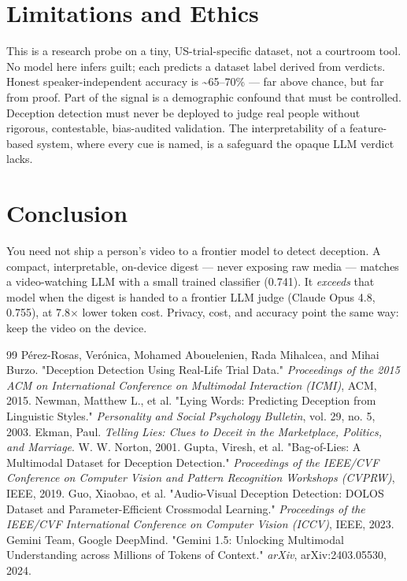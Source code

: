 \documentclass[11pt]{article}
\begin{document}
\section{Limitations and Ethics}

This is a research probe on a tiny, US-trial-specific dataset, not a courtroom tool. No model here infers guilt; each predicts a dataset label derived from verdicts. Honest speaker-independent accuracy is \textasciitilde{}65--70\% --- far above chance, but far from proof. Part of the signal is a demographic confound that must be controlled. Deception detection must never be deployed to judge real people without rigorous, contestable, bias-audited validation. The interpretability of a feature-based system, where every cue is named, is a safeguard the opaque LLM verdict lacks.

\section{Conclusion}

You need not ship a person's video to a frontier model to detect deception. A compact, interpretable, on-device digest --- never exposing raw media --- matches a video-watching LLM with a small trained classifier (0.741). It \emph{exceeds} that model when the digest is handed to a frontier LLM judge (Claude Opus 4.8, 0.755), at 7.8$\times$ lower token cost. Privacy, cost, and accuracy point the same way: keep the video on the device.

\begin{thebibliography}{99}
 Pérez-Rosas, Verónica, Mohamed Abouelenien, Rada Mihalcea, and Mihai Burzo. "Deception Detection Using Real-Life Trial Data." \emph{Proceedings of the 2015 ACM on International Conference on Multimodal Interaction (ICMI)}, ACM, 2015.
 Newman, Matthew L., et al. "Lying Words: Predicting Deception from Linguistic Styles." \emph{Personality and Social Psychology Bulletin}, vol. 29, no. 5, 2003.
 Ekman, Paul. \emph{Telling Lies: Clues to Deceit in the Marketplace, Politics, and Marriage}. W. W. Norton, 2001.
 Gupta, Viresh, et al. "Bag-of-Lies: A Multimodal Dataset for Deception Detection." \emph{Proceedings of the IEEE/CVF Conference on Computer Vision and Pattern Recognition Workshops (CVPRW)}, IEEE, 2019.
 Guo, Xiaobao, et al. "Audio-Visual Deception Detection: DOLOS Dataset and Parameter-Efficient Crossmodal Learning." \emph{Proceedings of the IEEE/CVF International Conference on Computer Vision (ICCV)}, IEEE, 2023.
 Gemini Team, Google DeepMind. "Gemini 1.5: Unlocking Multimodal Understanding across Millions of Tokens of Context." \emph{arXiv}, arXiv:2403.05530, 2024.
\end{thebibliography}
\end{document}
